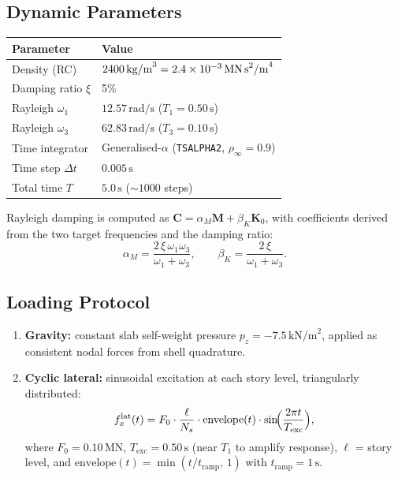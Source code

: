 \subsection{Dynamic Parameters}

\begin{center}
\begin{tabular}{ll}
  \toprule
  \textbf{Parameter}     & \textbf{Value} \\
  \midrule
  Density (RC)           & $2400\,\text{kg/m}^3 = 2.4 \times 10^{-3}\,\text{MN\,s}^2\text{/m}^4$ \\
  Damping ratio $\xi$    & 5\% \\
  Rayleigh $\omega_1$    & $12.57\,\text{rad/s}$ ($T_1 = 0.50\,\text{s}$) \\
  Rayleigh $\omega_3$    & $62.83\,\text{rad/s}$ ($T_3 = 0.10\,\text{s}$) \\
  Time integrator        & Generalised-$\alpha$ (\texttt{TSALPHA2}, $\rho_\infty = 0.9$) \\
  Time step $\Delta t$   & $0.005\,\text{s}$ \\
  Total time $T$         & $5.0\,\text{s}$  ($\sim\!1000$ steps) \\
  \bottomrule
\end{tabular}
\end{center}

Rayleigh damping is computed as $\mathbf{C} = \alpha_M \mathbf{M} + \beta_K \mathbf{K}_0$,
with coefficients derived from the two target frequencies and the damping ratio:
\begin{equation}
  \alpha_M = \frac{2\,\xi\,\omega_1 \omega_3}{\omega_1 + \omega_3}, \qquad
  \beta_K  = \frac{2\,\xi}{\omega_1 + \omega_3}.
\end{equation}

\subsection{Loading Protocol}

\begin{enumerate}
  \item \textbf{Gravity:} constant slab self-weight pressure
        $p_z = -7.5\,\text{kN/m}^2$, applied as consistent nodal forces
        from shell quadrature.
  \item \textbf{Cyclic lateral:} sinusoidal excitation at each story level,
        triangularly distributed:
        \begin{equation}
          f_x^{\text{lat}}(t) = F_0 \cdot \frac{\ell}{N_s}
                \cdot \text{envelope}(t)
                \cdot \sin\!\Bigl(\frac{2\pi t}{T_{\text{exc}}}\Bigr),
        \end{equation}
        where $F_0 = 0.10\,\text{MN}$, $T_{\text{exc}} = 0.50\,\text{s}$
        (near $T_1$ to amplify response), $\ell$ = story level, and
        $\text{envelope}(t) = \min(t / t_{\text{ramp}},\, 1)$ with
        $t_{\text{ramp}} = 1\,\text{s}$.
\end{enumerate}

